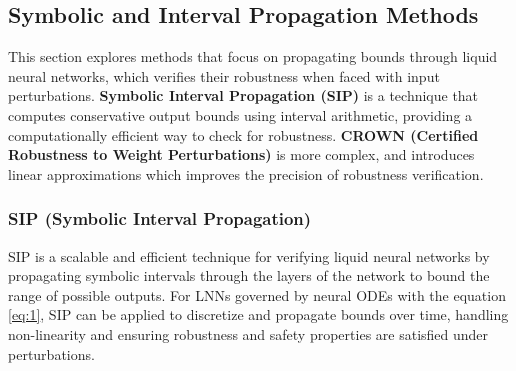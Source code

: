 \subsection*{Symbolic and Interval Propagation Methods}

This section explores methods that focus on propagating bounds through liquid neural networks, which verifies their robustness when faced with input perturbations. \textbf{Symbolic Interval Propagation (SIP)} is a technique that computes conservative output bounds using interval arithmetic, providing a computationally efficient way to check for robustness. \textbf{CROWN (Certified Robustness to Weight Perturbations)} is more complex, and introduces linear approximations which improves the precision of robustness verification.

\subsubsection*{SIP (Symbolic Interval Propagation)}

SIP is a scalable and efficient technique for verifying liquid neural networks by propagating symbolic intervals through the layers of the network to bound the range of possible outputs. For LNNs governed by neural ODEs with the equation \ref{eq:1}, SIP can be applied to discretize and propagate bounds over time, handling non-linearity and ensuring robustness and safety properties are satisfied under perturbations.

